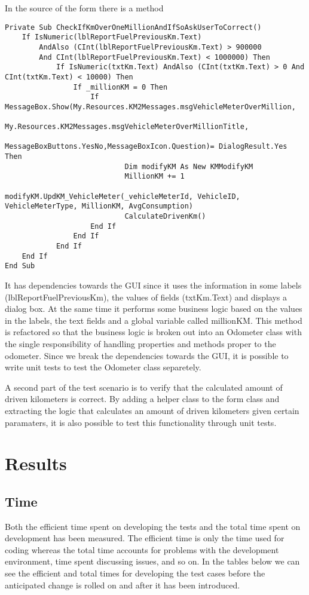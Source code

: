 \documentclass{article}
\begin{document}
			In the source of the form there is a method
			\begin{lstlisting}
Private Sub CheckIfKmOverOneMillionAndIfSoAskUserToCorrect()
	If IsNumeric(lblReportFuelPreviousKm.Text) 
		AndAlso (CInt(lblReportFuelPreviousKm.Text) > 900000 	
		And CInt(lblReportFuelPreviousKm.Text) < 1000000) Then
			If IsNumeric(txtKm.Text) AndAlso (CInt(txtKm.Text) > 0 And CInt(txtKm.Text) < 10000) Then
				If _millionKM = 0 Then
					If MessageBox.Show(My.Resources.KM2Messages.msgVehicleMeterOverMillion,
						My.Resources.KM2Messages.msgVehicleMeterOverMillionTitle,
						MessageBoxButtons.YesNo,MessageBoxIcon.Question)= DialogResult.Yes Then
							Dim modifyKM As New KMModifyKM 
							MillionKM += 1
							modifyKM.UpdKM_VehicleMeter(_vehicleMeterId, VehicleID, VehicleMeterType, MillionKM, AvgConsumption)
							CalculateDrivenKm()
					End If
				End If
			End If
	End If
End Sub
		\end{lstlisting}

			It has dependencies towards the GUI since it uses the information in some labels
			(lblReportFuelPreviousKm), the values of fields (txtKm.Text) and displays a dialog box.
			At the same time it performs some business logic based on the values in the labels, the text fields and a global variable called millionKM.
			This method is refactored so that the business logic is broken out into an Odometer class with the single responsibility of handling properties and methods proper to the odometer. Since we break the dependencies towards the GUI, it is possible to write unit tests to test the Odometer class separetely.

			A second part of the test scenario is to verify that the calculated amount of driven kilometers is correct. By adding a helper class to the form class and extracting the logic that calculates an amount of driven kilometers given certain paramaters, it is also possible to test this functionality through unit tests.

	\section{Results}
		\subsection{Time}
		Both the efficient time spent on developing the tests and the total time spent on development has been measured. The efficient time is only the time used for coding whereas the total time accounts for problems with the development environment, time spent discussing issues, and so on.
		In the tables below we can see the efficient and total times for developing the test cases before the anticipated change is rolled on and after it has been introduced.
\end{document}
